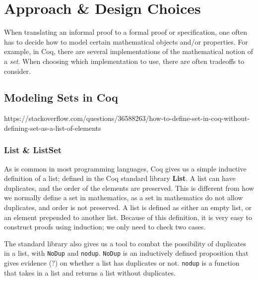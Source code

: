\chapter{Approach \& Design Choices}

When translating an informal proof to a formal proof or specification,
one often has to decide how to model certain mathematical objects
and/or properties. For example, in Coq, there are several implementations
of the mathematical notion of a \textit{set}. When choosing which implementation
to use, there are often tradeoffs to consider.

\section{Modeling Sets in Coq}

https://stackoverflow.com/questions/36588263/how-to-define-set-in-coq-without-defining-set-as-a-list-of-elements

\subsection{List \& ListSet}

As is common in most programming languages, Coq gives us a simple inductive definition of a list;
defined in the Coq standard library \textbf{List}.
A list can have duplicates, and the order of the elements are preserved. This is different from how we normally
define a set in mathematics, as a set in mathematics do not allow duplicates, and order is not preserved.
A list is defined as either an empty list, or an element prepended to another list.
Because of this definition, it is very easy to construct proofs using induction; we only need to check two cases.

The standard library also gives us a tool to combat the possibility of duplicates in a list,
with \texttt{NoDup} and \texttt{nodup}. \texttt{NoDup} is an inductively defined proposition that gives evidence (?) on whether a list
has duplicates or not. \texttt{nodup} is a function that takes in a list and returns a list without duplicates.

